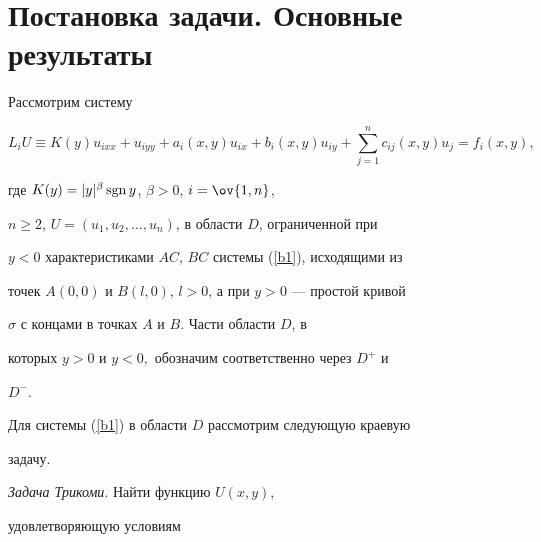 

\maketitle


\label{begin} 











\section{Постановка задачи. Основные результаты}





Рассмотрим систему


\begin{equation}\label{b1}


L_iU\equiv


K(y)u_{ixx}+u_{iyy}+a_i(x,y)u_{ix}+b_i(x,y)u_{iy}+\sum_{j=1}^nc_{ij}


(x,y)u_j=f_i(x,y),


\end{equation}


где $K(y)=|y|^{\beta} \operatorname{sgn} y$, $\beta>0$, $i=\ov {1,n}$,


$n\ge 2$, $U=(u_1,u_2,\dotsc,u_n)$, в области $D$, ограниченной при


$y<0$ характеристиками $AC$, $BC$ системы (\ref{b1}), исходящими из


точек $A(0,0)$ и $B(l,0)$, $l>0$, а при $y > 0$ --- простой кривой


$\sigma$ с концами в точках $A$ и $B$. Части области $D$, в


которых $y>0$ и $y<0,$ обозначим соответственно через $D^+$ и


$D^-$. 





Для системы (\ref{b1}) в области $D$ рассмотрим следующую краевую


задачу.


\medskip





{\it Задача Трикоми}. Найти функцию $U(x,y)$,


удовлетворяющую условиям


